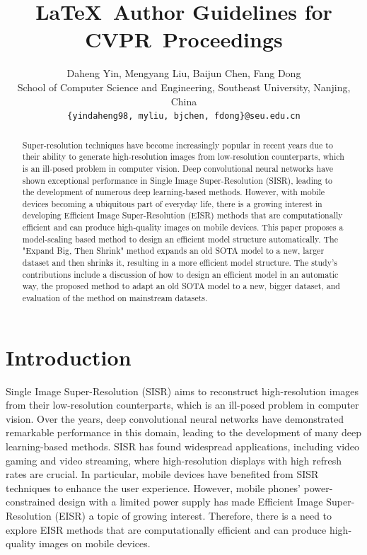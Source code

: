 \documentclass[10pt,twocolumn,letterpaper]{article}
\def\confName{CVPR}
\begin{document}
\title{\LaTeX\ Author Guidelines for \confName~Proceedings}


\author{Daheng Yin, Mengyang Liu, Baijun Chen, Fang Dong\\
School of Computer Science and Engineering, Southeast University, Nanjing, China\\
{\tt\small \{yindaheng98, myliu, bjchen, fdong\}@seu.edu.cn}
}
\maketitle

\begin{abstract}
  Super-resolution techniques have become increasingly popular in recent years due to their ability to generate high-resolution images from low-resolution counterparts, which is an ill-posed problem in computer vision. Deep convolutional neural networks have shown exceptional performance in Single Image Super-Resolution (SISR), leading to the development of numerous deep learning-based methods. However, with mobile devices becoming a ubiquitous part of everyday life, there is a growing interest in developing Efficient Image Super-Resolution (EISR) methods that are computationally efficient and can produce high-quality images on mobile devices. This paper proposes a model-scaling based method to design an efficient model structure automatically. The "Expand Big, Then Shrink" method expands an old SOTA model to a new, larger dataset and then shrinks it, resulting in a more efficient model structure.
  The study's contributions include a discussion of how to design an efficient model in an automatic way, the proposed method to adapt an old SOTA model to a new, bigger dataset, and evaluation of the method on mainstream datasets.
\end{abstract}

\section{Introduction}
\label{sec:intro}

Single Image Super-Resolution (SISR) aims to reconstruct high-resolution images from their low-resolution counterparts, which is an ill-posed problem in computer vision. Over the years, deep convolutional neural networks have demonstrated remarkable performance in this domain, leading to the development of many deep learning-based methods. SISR has found widespread applications, including video gaming and video streaming, where high-resolution displays with high refresh rates are crucial. In particular, mobile devices have benefited from SISR techniques to enhance the user experience. However, mobile phones' power-constrained design with a limited power supply has made Efficient Image Super-Resolution (EISR) a topic of growing interest. Therefore, there is a need to explore EISR methods that are computationally efficient and can produce high-quality images on mobile devices.
\end{document}
